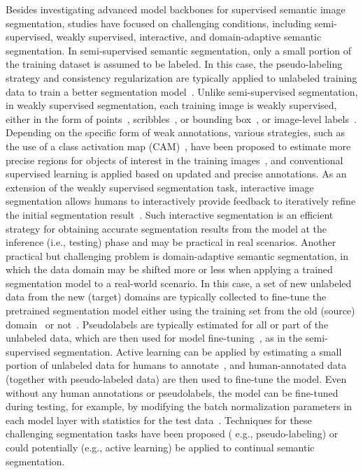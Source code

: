 \documentclass[onecolumn,conference,compsoc]{IEEEtran}
\begin{document}
\begin{spacing}{1.5}
Besides investigating advanced model backbones for supervised semantic image segmentation, studies {have focused} on challenging conditions, including semi-supervised, weakly supervised, interactive, and domain-adaptive semantic segmentation. {In semi-supervised} semantic segmentation, only a small portion of the training dataset {is assumed to be labeled}. In this case, {the pseudo-labeling} strategy and consistency regularization are {typically} applied to unlabeled training data to train a better segmentation model~\cite{SSSS_1,SSSS_2,SSSS_3}. {Unlike} semi-supervised segmentation, {in} weakly supervised segmentation, each training image is weakly supervised, either in the form of points~\cite{WSSS_point,WSSS_Point2}, scribbles~\cite{WSSS_scribbles2,WSSS_scribbles}, or bounding box~\cite{Lee2021BBAMBB,WSSS_bbox2,WSSS_bbox1}, or image-level labels~\cite{WSSS_RRM, WSSS_L2G, WSSS_OAA}. Depending on the specific form of weak annotations, various strategies, such as the {use of a} class activation map (CAM)~\cite{WSSS_RRM, WSSS_OAA}, have been proposed to estimate more precise regions for objects of interest in the training images~\cite{WSSS_ref5,WSSS_ref6,WSSS_L2G}, and {conventional supervised} learning is applied based on updated and precise annotations. As an extension of the weakly supervised segmentation task, interactive image segmentation allows {humans} to interactively provide feedback to {iteratively} refine the initial segmentation result~\cite{IS_1,IS_2,IS_3_MIDeepSeg}. Such interactive segmentation {is} an efficient strategy {for obtaining} accurate segmentation {results} from the model at the {inference} (i.e., testing) phase and may be practical in real scenarios. Another practical but challenging problem is domain-adaptive semantic segmentation, {in which} the data domain may be {shifted} more or less when applying a trained segmentation model to a {real-world} scenario. In this case, a set of new unlabeled data from the new (target) {domains are typically} collected to fine-tune the {pretrained} segmentation model either {using the} training set from the old (source) domain~\cite{Chen2019DomainAF,You_ref51} or not~\cite{You_MM2021,You_arxiv2021}. {Pseudolabels are typically} estimated for all or part of the unlabeled data, which are then used for model fine-tuning~\cite{You_MM2021}, as in the semi-supervised segmentation. Active learning {can} be applied by estimating a small portion of unlabeled data for humans to annotate~\cite{You_MM2022}, and human-annotated data (together with pseudo-labeled data) are then used to fine-tune the model. Even without any human annotations {or pseudolabels}, the model {can be} fine-tuned during testing, {for example,} by modifying the batch normalization parameters in each model layer with statistics {for the} test data~\cite{You_arxiv2021}. {Techniques} for these challenging segmentation tasks have been {proposed} ( e.g., pseudo-labeling) or could potentially (e.g., active learning) be applied to continual semantic segmentation.




\end{spacing}
\end{document}
